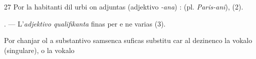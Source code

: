 \begin{VUpage}[31]{27}
Por la habitanti dil urbi on adjuntas  (adjektivo\nl
\textit{-ana}) :  (pl. \textit{Paris-ani}), \nl
{} (2).

\VUblancAlinea
\VUsaut{4.0mm}
\VUsaut{4.6mm}

. --- L'\textit{adjektivo qualifikanta} finas per  e ne varias (3).

Por chanjar ol a substantivo samsenca suficas substitu\cc
car al dezinenco  la vokalo  (singulare), o la vokalo 
\parplein
\end{VUpage}

